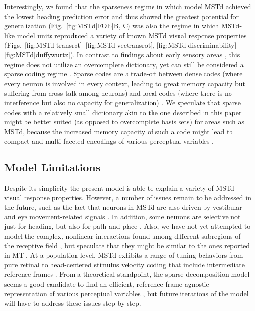 Interestingly, we found that the sparseness regime in which model \ac{MSTd} achieved the
lowest heading prediction error and thus showed the greatest potential for generalization 
(Fig.~\ref{fig:MSTd|FOE}B, C) was also the regime in which \ac{MSTd}-like model units
reproduced a variety of known \ac{MSTd} visual response properties
(Figs.~\ref{fig:MSTd|transrot}--\ref{fig:MSTd|vectransrot},
\ref{fig:MSTd|discriminability}--\ref{fig:MSTd|duffywurtz}).
In contrast to findings about early sensory areas
\citep{OlshausenField1996,OlshausenField1997,VinjeGallant2000}, this regime does not 
utilize an overcomplete dictionary, yet can still be considered a sparse coding regime
\citep{SpanneJorntell2015}.
Sparse codes are a trade-off between dense codes (where every neuron is involved in 
every context, leading to great memory capacity but suffering from cross-talk among 
neurons) and local codes (where there is no interference but also no capacity for
generalization) \citep{SpanneJorntell2015}. 
We speculate that sparse codes with a relatively small dictionary akin to the one
described in this paper might be better suited (as opposed to overcomplete basis sets) 
for areas such as \ac{MSTd}, because the increased memory capacity of such a code might 
lead to compact and multi-faceted encodings of various perceptual variables 
\citep{Bremmer1998,BenHamed2003,Brostek2014}.

\subsection{Model Limitations}
\label{sec:MSTd|discussion|limitations}
Despite its simplicity the present model is able to explain a variety of \ac{MSTd}
visual response properties. However, a number of issues remain to be addressed in the 
future, such as the fact that neurons in \ac{MSTd} are also driven by vestibular
\citep{PageDuffy2003,Gu2006,Takahashi2007} and eye movement-related signals
\citep{KomatsuWurtz1988,Newsome1988,Bradley1996,PageDuffy1999,Morris2012}.
In addition, some neurons are selective not just for heading, but also for path and place
\citep{FroehlerDuffy2002,Page2015}. Also, we have not yet attempted to model the complex, 
nonlinear interactions found among different subregions of the receptive field 
\citep{DuffyWurtz1991b,Lagae1994,Mineault2012}, but speculate that they might be similar 
to the ones reported in \ac{MT} \citep{Majaj2007,Richert2013}.
At a population level, \ac{MSTd} exhibits a range of tuning behaviors from pure retinal 
to head-centered stimulus velocity coding \citep{BenHamed2003,Yu2010,Brostek2014}
that include intermediate reference frames \citep{Fetsch2007}.
From a theoretical standpoint, the sparse decomposition model seems a good candidate to 
find an efficient, reference frame-agnostic representation of various perceptual 
variables \citep{PougetSejnowski1997,PougetSnyder2000,BenHamed2003},
but future iterations of the model will have to address these issues step-by-step.

